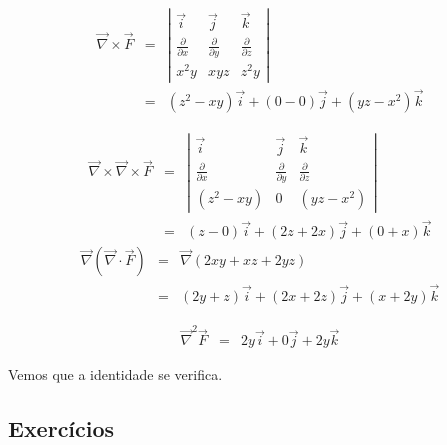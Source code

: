 \begin{resol}


 \begin{eqnarray*}
   \vec{\nabla}\times \vec{F}&=&\left|
   \begin{array}{ccc}
    \vec{i}&\vec{j}&\vec{k}\\[.5cm]
    \frac{\partial }{\partial x}&\frac{\partial }{\partial y}&\frac{\partial }{\partial z}\\[.5cm]
    x^2y&xyz&z^2y
   \end{array}\right|\\
   &=&\left(z^2-xy\right)\vec{i}+\left(0-0\right)\vec{j}+\left(yz-x^2\right)\vec{k}
 \end{eqnarray*}

 \begin{eqnarray*}
   \vec{\nabla}\times\vec{\nabla}\times \vec{F}&=&\left|
   \begin{array}{ccc}
    \vec{i}&\vec{j}&\vec{k}\\[.5cm]
    \frac{\partial }{\partial x}&\frac{\partial }{\partial y}&\frac{\partial }{\partial z}\\[.5cm]
    (z^2-xy)&0&(yz-x^2)
   \end{array}\right|\\
   &=&\left(z-0\right)\vec{i}+\left(2z+2x\right)\vec{j}+\left(0+x\right)\vec{k}
 \end{eqnarray*}
 \begin{eqnarray*}
  \vec{\nabla}(\vec{\nabla}\cdot\vec{F})&=&\vec{\nabla}(2xy+xz+2yz)\\
  &=&(2y+z)\vec{i}+(2x+2z)\vec{j}+(x+2y)\vec{k}
 \end{eqnarray*}

\begin{eqnarray*}
  \vec{\nabla}^2\vec{F}&=&2y\vec{i}+0\vec{j}+2y\vec{k}
 \end{eqnarray*}

 Vemos que a identidade se verifica.

\end{resol}

\subsection*{Exercícios}
